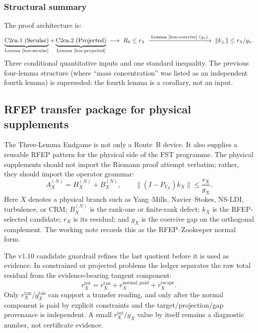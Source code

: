 \documentclass[11pt,a4paper]{article}
\theoremstyle{plain}
\theoremstyle{definition}
\begin{document}
\subsubsection{Structural summary}

The proof architecture is:
\[
\underbrace{\text{C2ca.1 (Secular)}}_{\text{Lemma~\ref{lem:secular}}}
+ \underbrace{\text{C2ca.2 (Projected)}}_{\text{Lemma~\ref{lem:projected}}}
\;\longrightarrow\; R_0 \leq r_\lambda
\;\xrightarrow{\;\text{Lemma~\ref{lem:coercive} } (g_*)\;}
\;\|k_\perp\| \leq r_\lambda / g_*.
\]
Three conditional quantitative inputs and one standard inequality.
The previous four-lemma structure (where ``mass
concentration'' was listed as an independent fourth lemma) is
superseded: the fourth lemma is a corollary, not an input.

\subsection{RFEP transfer package for physical supplements}
\label{sec:rfep-physics-transfer}

The Three-Lemma Endgame is not only a Route~B device.  It also
supplies a reusable RFEP pattern for the physical side of the
FST programme.  The physical supplements should not import the
Riemann proof attempt verbatim; rather, they should import the
operator grammar:
\[
  A_X^{(N)} = H_X^{(N)} + B_X^{(N)}, \qquad
  \|(I-P_{V_X})k_X\| \leq \frac{r_X}{g_X}.
\]
Here $X$ denotes a physical branch such as Yang--Mills,
Navier--Stokes, NS-LDI, turbulence, or CRM; $B_X^{(N)}$ is the
rank-one or finite-rank defect; $k_X$ is the RFEP-selected candidate;
$r_X$ is its residual; and $g_X$ is the coercive gap on the
orthogonal complement.  The working note \cite{RFEPTransferNote}
records this as the RFEP--Zookeeper normal form.

The v1.10 candidate guardrail refines the last quotient before it is used as
evidence.  In constrained or projected problems the ledger separates
the raw total residual from the evidence-bearing tangent component:
\[
  r_X^{\mathrm{tot}}
  =
  r_X^{\mathrm{tan}}
  + r_X^{\mathrm{normal,paid}}
  + r_X^{\mathrm{escape}}.
\]
Only $r_X^{\mathrm{tan}}/g_X^{\mathrm{tan}}$ can support a transfer
reading, and only after the normal component is paid by explicit
constraints and the target/projection/gap provenance is independent.
A small $r_X^{\mathrm{tot}}/g_X$ value by itself remains a diagnostic
number, not certificate evidence.
\end{document}
